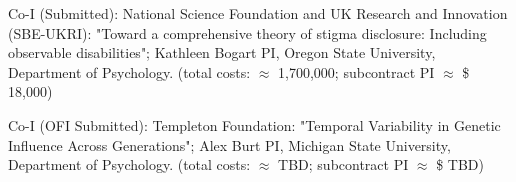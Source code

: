 \item Co-I (Submitted): National Science Foundation and UK Research and Innovation (SBE-UKRI): "Toward a comprehensive theory of stigma disclosure: Including observable disabilities"; Kathleen Bogart PI, Oregon State University, Department of Psychology.  (total costs: $\approx$ 1,700,000; subcontract PI $\approx$ \$ 18,000)

\item Co-I (OFI Submitted): Templeton Foundation: "Temporal Variability in Genetic Influence Across Generations"; Alex Burt PI, Michigan State University, Department of Psychology.  (total costs: $\approx$ TBD; subcontract PI $\approx$ \$ TBD)



%
%
